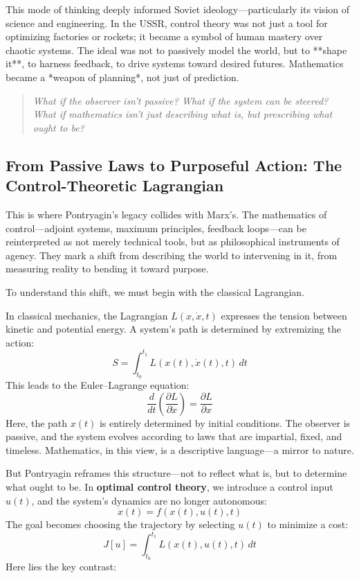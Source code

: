 This mode of thinking deeply informed Soviet ideology—particularly its vision of science and engineering. In the USSR, control theory was not just a tool for optimizing factories or rockets; it became a symbol of human mastery over chaotic systems. The ideal was not to passively model the world, but to **shape it**, to harness feedback, to drive systems toward desired futures. Mathematics became a *weapon of planning*, not just of prediction.

\begin{quote}
\emph{What if the observer isn’t passive? What if the system can be steered? What if mathematics isn't just describing what is, but prescribing what ought to be?}
\end{quote}

\subsection{From Passive Laws to Purposeful Action: The Control-Theoretic Lagrangian}

This is where Pontryagin’s legacy collides with Marx’s. The mathematics of control—adjoint systems, maximum principles, feedback loops—can be reinterpreted as not merely technical tools, but as philosophical instruments of agency. They mark a shift from describing the world to intervening in it, from measuring reality to bending it toward purpose.

To understand this shift, we must begin with the classical Lagrangian.

In classical mechanics, the Lagrangian \( L(x, \dot{x}, t) \) expresses the tension between kinetic and potential energy. A system’s path is determined by extremizing the action:
\[
S = \int_{t_0}^{t_1} L(x(t), \dot{x}(t), t) \, dt
\]
This leads to the Euler–Lagrange equation:
\[
\frac{d}{dt} \left( \frac{\partial L}{\partial \dot{x}} \right) = \frac{\partial L}{\partial x}
\]
Here, the path \( x(t) \) is entirely determined by initial conditions. The observer is passive, and the system evolves according to laws that are impartial, fixed, and timeless. Mathematics, in this view, is a descriptive language—a mirror to nature.

But Pontryagin reframes this structure—not to reflect what is, but to determine what ought to be. In \textbf{optimal control theory}, we introduce a control input \( u(t) \), and the system’s dynamics are no longer autonomous:
\[
\dot{x}(t) = f(x(t), u(t), t)
\]
The goal becomes choosing the trajectory by selecting \( u(t) \) to minimize a cost:
\[
J[u] = \int_{t_0}^{t_1} L(x(t), u(t), t) \, dt
\]
Here lies the key contrast:


